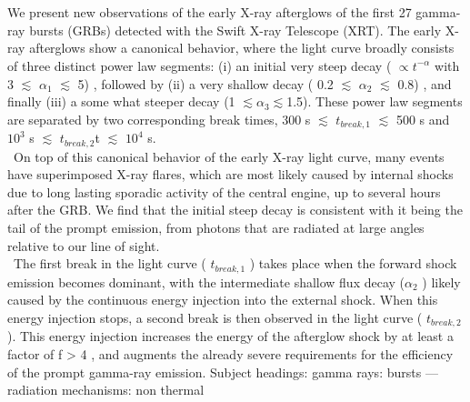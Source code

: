\section*{}
We present new observations of the early X-ray afterglows of the first 27
gamma-ray bursts (GRBs) detected with the Swift X-ray Telescope (XRT). The
early X-ray afterglows show a canonical behavior, where the light curve broadly
consists of three distinct power law segments: (i) an initial very steep decay
( $\propto  t^{-\alpha} $  with 3 $\lesssim $  $\alpha_{1} $ $\lesssim $ 5) , followed by (ii) a very shallow decay ( 0.2 $\lesssim$  $ \alpha_{2} $ $\lesssim $ 0.8) , and finally (iii) a some what steeper decay (1 $\lesssim  \alpha_{3} \lesssim $1.5). These power law segments are separated by two corresponding break times, 300 s $\lesssim $  $ t_{break,1} $  $\lesssim $ 500 s and $ 10^{3} $ s  $\lesssim $ $ t_{break,2} $t $\lesssim $ $ 10^{4} $ s.\\\
 On top of this canonical behavior of the early X-ray light curve, many events have superimposed X-ray flares, which are most likely caused by internal shocks due to long lasting sporadic activity of the central engine, up to several hours after the GRB. We find that the initial steep decay is consistent with it being the tail of the prompt emission, from photons that are radiated at large angles relative to our line of sight.\\\ The first break in the light curve ( $ t_{break,1} $ ) takes place when the forward shock emission becomes dominant, with the intermediate shallow flux decay ($ \alpha_{2} $ ) likely caused by the continuous energy injection into the external shock. When this energy injection stops, a second break is then observed in the light curve ( $ t_{break,2} $  ). This energy injection increases the energy of the afterglow shock by at least a factor of f > 4 , and augments the already severe requirements for the efficiency of the prompt gamma-ray emission.
Subject headings: gamma rays: bursts — radiation mechanisms: non thermal